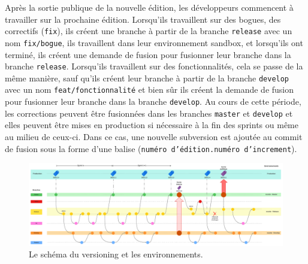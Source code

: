Après la sortie publique de la nouvelle édition, les développeurs commencent à travailler sur la prochaine édition. Lorsqu'ils travaillent sur des bogues, des correctifs (\texttt{fix}), ils créent une branche à partir de la branche \texttt{release} avec un nom \texttt{fix/{bogue}}, ils travaillent dans leur environnement sandbox, et lorsqu'ils ont terminé, ils créent une demande de fusion pour fusionner leur branche dans la branche \texttt{release}. Lorsqu'ils travaillent sur des fonctionnalités, cela se passe de la même manière, sauf qu'ils créent leur branche à partir de la branche \texttt{develop} avec un nom \texttt{feat/{fonctionnalité}} et bien sûr ils créent la demande de fusion pour fusionner leur branche dans la branche \texttt{develop}. Au cours de cette période, les corrections peuvent être fusionnées dans les branches \texttt{master} et \texttt{develop} et elles peuvent être mises en production si nécessaire à la fin des sprints ou même au milieu de ceux-ci. Dans ce cas, une nouvelle subversion est ajoutée au commit de fusion sous la forme d'une balise (\texttt{{numéro d'édition}.{numéro d'increment}}).

\begin{figure}
    \centering
    \includegraphics[width=\textwidth]{img/versioning-and-environments}
    \caption{Le schéma du versioning et les environnements.}
    \label{fig:versioning-and-environments}
\end{figure}

